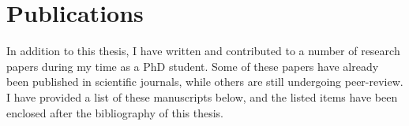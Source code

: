 \chapter*{Publications}
\noindent
In addition to this thesis, I have written and contributed to a number of research papers during my time as a PhD student.
Some of these papers have already been published in scientific journals, while others are still undergoing peer-review.
I have provided a list of these manuscripts below, and the listed items have been enclosed after the bibliography of this thesis.

\printpapers
